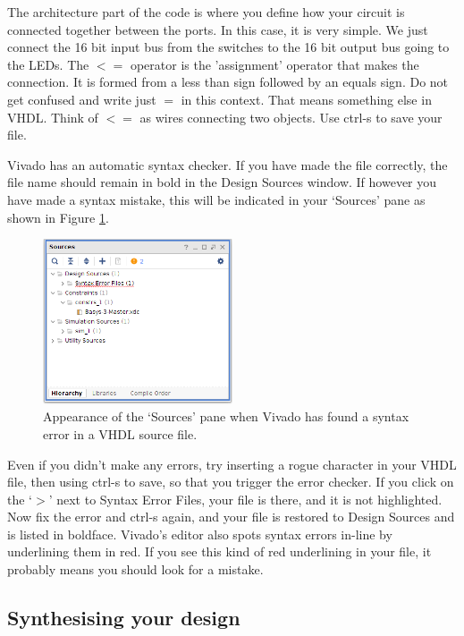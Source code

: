 \documentclass[../physical_computing.tex]{subfiles}
\begin{document}
The architecture part of the code is where you define how your circuit is connected together between the ports. In this case, it is very simple. We just connect the 16 bit input bus from the switches to the 16 bit output bus going to the LEDs. The $<=$ operator is the 'assignment' operator that makes the connection. It is formed from a less than sign followed by an equals sign. Do not get confused and write just $=$ in this context. That means something else in VHDL. Think of $<=$ as wires connecting two objects. Use ctrl-s to save your file.

Vivado has an automatic syntax checker. If you have made the file correctly, the file name should remain in bold in the Design Sources window. If however you have made a syntax mistake, this will be indicated in your `Sources' pane as shown in Figure \ref{fig:syntaxerror}.

\begin{figure}[htbp]
    \centering
    \includegraphics[width=0.5\textwidth]{figures/syntax_error.png}
    \caption{Appearance of the `Sources' pane when Vivado has found a syntax error in a VHDL source file.}
    \label{fig:syntaxerror}
\end{figure}

Even if you didn't make any errors, try inserting a rogue character in your VHDL file, then using ctrl-s to save, so that you trigger the error checker. If you click on the `$>$' next to Syntax Error Files, your file is there, and it is not highlighted. Now fix the error and ctrl-s again, and your file is restored to Design Sources and is listed in boldface. Vivado's editor also spots syntax errors in-line by underlining them in red. If you see this kind of red underlining in your file, it probably means you should look for a mistake.

\subsection{Synthesising your design}
\label{sec:synthesis}
\end{document}
